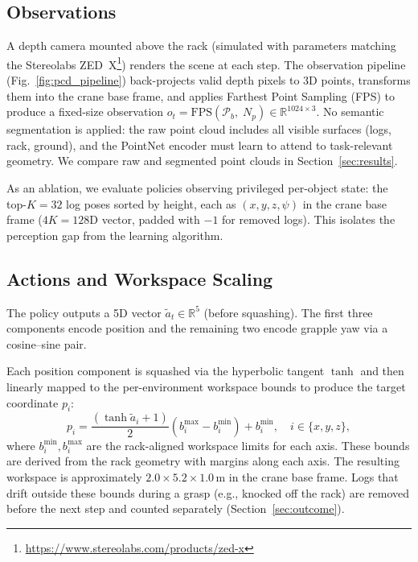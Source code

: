 \documentclass[conference]{IEEEtran}
\begin{document}
\subsection{Observations}
\label{sec:obs}
A depth camera mounted above the rack (simulated with parameters matching the Stereolabs ZED~X\footnote{\url{https://www.stereolabs.com/products/zed-x}}) renders the scene at each step.
The observation pipeline (Fig.~\ref{fig:pcd_pipeline}) back-projects valid depth pixels to 3D points, transforms them into the crane base frame, and applies Farthest Point Sampling (FPS) to produce a fixed-size observation $o_t = \mathrm{FPS}(\mathcal{P}_b,\; N_p) \in \mathbb{R}^{1024 \times 3}$.
No semantic segmentation is applied: the raw point cloud includes all visible surfaces (logs, rack, ground), and the PointNet encoder must learn to attend to task-relevant geometry.
We compare raw and segmented point clouds in Section~\ref{sec:results}.

As an ablation, we evaluate policies observing privileged per-object state: the top-$K\!=\!32$ log poses sorted by height, each as $(x,y,z,\psi)$ in the crane base frame ($4K = 128$D vector, padded with $-1$ for removed logs).
This isolates the perception gap from the learning algorithm.

\subsection{Actions and Workspace Scaling}
\label{sec:actions}
The policy outputs a 5D vector $\tilde{a}_t \in \mathbb{R}^5$ (before squashing).
The first three components encode position and the remaining two encode grapple yaw via a cosine--sine pair.

Each position component is squashed via the hyperbolic tangent $\tanh$ and then linearly mapped to the per-environment workspace bounds to produce the target coordinate $p_i$:
\begin{equation}
    p_i = \frac{(\tanh \tilde{a}_i + 1)}{2}(b_i^{\max} - b_i^{\min}) + b_i^{\min}, \quad i \in \{x,y,z\},
\end{equation}
where $b_i^{\min}, b_i^{\max}$ are the rack-aligned workspace limits for each axis.
These bounds are derived from the rack geometry with margins along each axis.
The resulting workspace is approximately $2.0 \times 5.2 \times 1.0$\,m in the crane base frame.
Logs that drift outside these bounds during a grasp (e.g., knocked off the rack) are removed before the next step and counted separately (Section~\ref{sec:outcome}).
\end{document}
